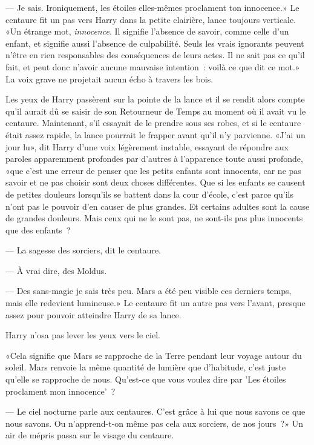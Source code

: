 --- Je sais. Ironiquement, les étoiles elles-mêmes proclament ton innocence.» Le centaure fit un pas vers Harry dans la petite clairière, lance toujours verticale. «Un étrange mot, \emph{innocence}. Il signifie l'absence de savoir, comme celle d'un enfant, et signifie aussi l'absence de culpabilité. Seuls les vrais ignorants peuvent n'être en rien responsables des conséquences de leurs actes. Il ne sait pas ce qu'il fait, et peut donc n'avoir aucune mauvaise intention~: voilà ce que dit ce mot.» La voix grave ne projetait aucun écho à travers les bois.

Les yeux de Harry passèrent sur la pointe de la lance et il se rendit alors compte qu'il aurait dû se saisir de son Retourneur de Temps au moment où il avait vu le centaure. Maintenant, s'il essayait de le prendre sous ses robes, et si le centaure était assez rapide, la lance pourrait le frapper avant qu'il n'y parvienne. «J'ai un jour lu», dit Harry d'une voix légèrement instable, essayant de répondre aux paroles apparemment profondes par d'autres à l'apparence toute aussi profonde, «que c'est une erreur de penser que les petits enfants sont innocents, car ne pas savoir et ne pas choisir sont deux choses différentes. Que si les enfants se causent de petites douleurs lorsqu'ils se battent dans la cour d'école, c'est parce qu'ils n'ont pas le pouvoir d'en causer de plus grandes. Et certains adultes sont la cause de grandes douleurs. Mais ceux qui ne le sont pas, ne sont-ils pas plus innocents que des enfants~?

--- La sagesse des sorciers, dit le centaure.

--- À vrai dire, des Moldus.

--- Des sans-magie je sais très peu. Mars a été peu visible ces derniers temps, mais elle redevient lumineuse.» Le centaure fit un autre pas vers l'avant, presque assez pour pouvoir atteindre Harry de sa lance.

Harry n'osa pas lever les yeux vers le ciel.

«Cela signifie que Mars se rapproche de la Terre pendant leur voyage autour du soleil. Mars renvoie la même quantité de lumière que d'habitude, c'est juste qu'elle se rapproche de nous. Qu'est-ce que vous voulez dire par 'Les étoiles proclament mon innocence'~?

--- Le ciel nocturne parle aux centaures. C'est grâce à lui que nous savons ce que nous savons. Ou n'apprend-t-on même pas cela aux sorciers, de nos jours~?» Un air de mépris passa sur le visage du centaure.

